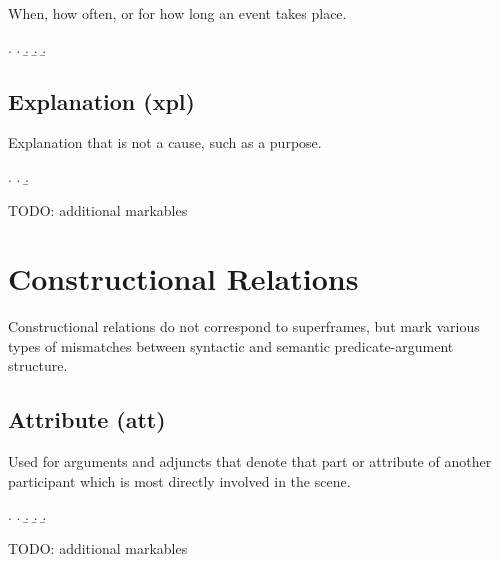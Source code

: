 \documentclass[a4paper]{article}
\begin{document}
When, how often, or for how long an event takes place.

\ex.
\a. 
\b. 
\b. 
\b. 


\clearpage
\subsection{Explanation (\textsf{xpl})}
\label{sec:xpl}

Explanation that is not a cause, such as a purpose.

\ex.
\a. 
\b. 

TODO: additional markables


\clearpage
\section{Constructional Relations}

Constructional relations do not correspond to superframes, but mark various
types of mismatches between syntactic and semantic predicate-argument
structure.


\subsection{Attribute (\textsf{att})}
\label{sec:att}

Used for arguments and adjuncts that denote that part or attribute of another
participant which is most directly involved in the scene.

\ex.
\a. 
\b. 
\b. 
\b. 

TODO: additional markables

\end{document}
